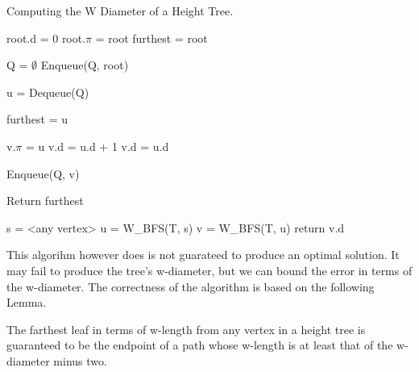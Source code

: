 \begin{algorithm}

\caption{Computing the W Diameter of a Height Tree.}

\begin{algorithmic}[1]

    \State root.d = 0
    \State root.$\pi$ = root
    \State furthest = root

    \State Q = $\emptyset$
    \State Enqueue(Q, root)

        \State u = Dequeue(Q)

            \State furthest = u
        \EndIf

                \State v.$\pi$ = u
                    \State v.d = u.d + 1
                \Else
                    \State v.d = u.d
                \EndIf

                \State Enqueue(Q, v)

            \EndIf
        \EndFor
    \EndWhile
    \State Return furthest
\EndFunction

    \State s = <any vertex>
    \State u = W\_BFS(T, s)
    \State v = W\_BFS(T, u)
    \State return v.d
\EndFunction

\end{algorithmic}
\end{algorithm}



This algorihm however does is not guarateed to produce an optimal solution. It may fail to produce the tree's w-diameter, but we can bound the error in terms of the w-diameter. The correctness of the algorithm is based on the following Lemma.

\begin{lem} The farthest leaf in terms of w-length from any vertex in a height tree is guaranteed to be the endpoint of a path whose w-length is at least that of the w-diameter minus two.
\label{lem:2xbfs-proof}
\end{lem}

